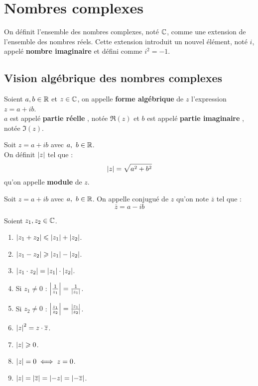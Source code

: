 \chapter{Nombres complexes}
\def\arraystretch{1}
On définit l'ensemble des nombres complexes, noté $\mathbb{C}$, comme une extension de l'ensemble des nombres réels.
Cette extension introduit un nouvel élément, noté $i$, appelé \textbf{nombre imaginaire} et défini comme $i^2=-1$.

\section{Vision algébrique des nombres complexes}
\begin{definition}
    Soient $a, b \in \mathbb{R}$ et $z \in \mathbb{C}$, on appelle \textbf{forme algébrique} de $z$ l'expression $z = a + ib$.
    \\
    $a$ est appelé \og \textbf{partie réelle} \fg, notée $\Re(z)$ et $b$ est appelé \og \textbf{partie imaginaire} \fg, notée $\Im(z)$.
\end{definition}

\begin{definition}
    Soit $z = a + ib$ avec $a,\ b \in \mathbb{R}$. 
    \\
    On définit $\abs{z}$ tel que :
    \[ \abs{z} = \sqrt{a^2 + b^2} \]
    qu'on appelle \textbf{module} de $z$.
\end{definition}

\begin{definition}
    Soit $z = a + ib$ avec $a,\ b \in \mathbb{R}$. On appelle conjugué de $z$ qu'on note $\overline{z}$ tel que :
    \[ \overline{z} = a - ib \]
\end{definition}

\begin{proposition}
    Soient $z_1, z_2 \in \mathbb{C}$.
    \begin{enumerate}
            \item $\abs{z_1 + z_2} \leqslant \abs{z_1} + \abs{z_2}$.
            \item $\abs{z_1 - z_2} \geqslant \abs{z_1} - \abs{z_2}$.
            \item $\abs{z_1 \cdot z_2} = \abs{z_1} \cdot \abs{z_2}$.
            \item Si $z_1 \neq 0$ : $\abs{\frac{1}{z_1}} = \frac{1}{\abs{z_1}}$.
            \item Si $z_2 \neq 0$ : $\abs{\frac{z_1}{z_2}} = \frac{\abs{z_1}}{\abs{z_2}}$.
            \item $\abs{z}^2 = z \cdot \overline{z}$.
            \item $\abs{z} \geqslant 0$.
            \item $\abs{z} = 0 \iff z = 0$.
            \item $\abs{z} = \abs{\overline{z}} = \abs{-z} = \abs{-\overline{z}}$.
        \end{enumerate}
\end{proposition}

